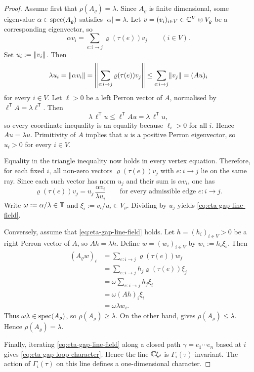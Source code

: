 \begin{proof}
  Assume first that \(\rho(A_\varrho)=\lambda\). Since
  \(A_\varrho\) is finite dimensional, some eigenvalue
  \(\alpha\in\operatorname{spec}(A_\varrho)\) satisfies \(|\alpha|=\lambda\). Let
  \(v=(v_i)_{i\in V}\in \mathbb{C}^V\otimes V_\varrho\) be a corresponding
  eigenvector, so
  \[
    \alpha v_i=\sum_{e:i\to j}\varrho(\tau(e))v_j
    \qquad (i\in V).
  \]
  Set \(u_i:=\lVert v_i \rVert\). Then
  \[
    \lambda u_i
    =
    \lVert \alpha v_i \rVert
    =
    \left\|\sum_{e:i\to j}\varrho(\tau(e))v_j\right\|
    \le
    \sum_{e:i\to j}\lVert v_j \rVert
    =(Au)_i
  \]
  for every \(i\in V\). Let \(\ell>0\) be a left Perron vector of
  \(A\), normalised by \(\ell^{\mathsf T}A=\lambda\ell^{\mathsf T}\).
  Then
  \[
    \lambda\,\ell^{\mathsf T}u
    \le
    \ell^{\mathsf T}Au
    =
    \lambda\,\ell^{\mathsf T}u,
  \]
  so every coordinate inequality is an equality because \(\ell_i>0\)
  for all \(i\). Hence \(Au=\lambda u\). Primitivity of \(A\) implies
  that \(u\) is a positive Perron eigenvector, so \(u_i>0\) for every
  \(i\in V\).

  Equality in the triangle inequality now holds in every vertex
  equation. Therefore, for each fixed \(i\), all non-zero vectors
  \(\varrho(\tau(e))v_j\) with \(e:i\to j\) lie on the same ray. Since
  each such vector has norm \(u_j\) and their sum is \(\alpha v_i\),
  one has
  \[
    \varrho(\tau(e))v_j
    =
    u_j\,\frac{\alpha v_i}{\lambda u_i}
    \qquad
    \text{for every admissible edge } e:i\to j.
  \]
  Write \(\omega:=\alpha/\lambda\in\mathbb{T}\) and
  \(\xi_i:=v_i/u_i\in V_\varrho\). Dividing by \(u_j\) yields
  \eqref{eq:eta-gap-line-field}.

  Conversely, assume that \eqref{eq:eta-gap-line-field} holds. Let
  \(h=(h_i)_{i\in V}>0\) be a right Perron vector of \(A\), so
  \(Ah=\lambda h\). Define \(w=(w_i)_{i\in V}\) by
  \(w_i:=h_i\xi_i\). Then
  \begin{align*}
    (A_\varrho w)_i
    &=
    \sum_{e:i\to j}\varrho(\tau(e))w_j \\
    &=
    \sum_{e:i\to j}h_j\varrho(\tau(e))\xi_j \\
    &=
    \omega\sum_{e:i\to j}h_j\xi_i \\
    &=
    \omega(Ah)_i\xi_i \\
    &=
    \omega\lambda w_i.
  \end{align*}
  Thus \(\omega\lambda\in\operatorname{spec}(A_\varrho)\), so
  \(\rho(A_\varrho)\ge \lambda\). On the other hand,
   gives
  \(\rho(A_\varrho)\le \lambda\). Hence
  \(\rho(A_\varrho)=\lambda\).

  Finally, iterating \eqref{eq:eta-gap-line-field} along a closed path
  \(\gamma=e_1\cdots e_n\) based at \(i\) gives
  \eqref{eq:eta-gap-loop-character}. Hence the line \(\mathbb{C}\xi_i\) is
  \(\Gamma_i(\tau)\)-invariant. The action of \(\Gamma_i(\tau)\) on
  this line defines a one-dimensional character.
\end{proof}

